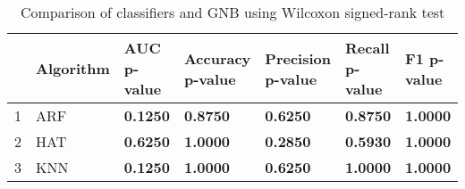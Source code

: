 \begin{table}
\footnotesize
\caption{Comparison of classifiers and GNB using Wilcoxon signed-rank test}
\label{tab:wilcoxon comparison}
\begin{tabular}{lllllll}
\hline
 & Algorithm & AUC p-value & Accuracy p-value & Precision p-value & Recall p-value & F1 p-value \\
\hline
1 & ARF & \textbf{0.1250} & \textbf{0.8750} & \textbf{0.6250} & \textbf{0.8750} & \textbf{1.0000} \\
2 & HAT & \textbf{0.6250} & \textbf{1.0000} & \textbf{0.2850} & \textbf{0.5930} & \textbf{1.0000} \\
3 & KNN & \textbf{0.1250} & \textbf{1.0000} & \textbf{0.6250} & \textbf{1.0000} & \textbf{1.0000} \\
\hline
\end{tabular}
\end{table}
